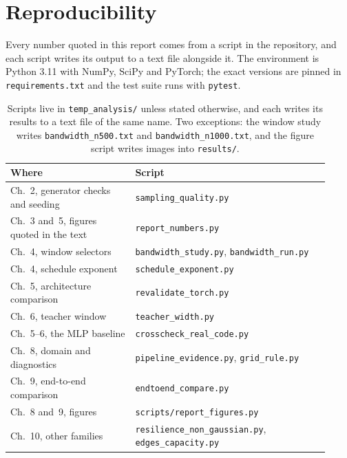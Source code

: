 \documentclass[11pt]{article}
\begin{document}
\section{Reproducibility}
\label{app:repro}

Every number quoted in this report comes from a script in the repository, and each script
writes its output to a text file alongside it. The environment is Python 3.11 with NumPy,
SciPy and PyTorch; the exact versions are pinned in \texttt{requirements.txt} and the test
suite runs with \texttt{pytest}.

\begin{table}[H]
\centering
\begin{tabular}{@{}>{\raggedright\arraybackslash}p{0.36\linewidth}%
                  >{\raggedright\arraybackslash}p{0.56\linewidth}@{}}
\toprule
\textbf{Where} & \textbf{Script} \\
\midrule
Ch.~2, generator checks and seeding & \texttt{sampling\_quality.py} \\
Ch.~3 and~5, figures quoted in the text & \texttt{report\_numbers.py} \\
Ch.~4, window selectors & \texttt{bandwidth\_study.py}, \texttt{bandwidth\_run.py} \\
Ch.~4, schedule exponent & \texttt{schedule\_exponent.py} \\
Ch.~5, architecture comparison & \texttt{revalidate\_torch.py} \\
Ch.~6, teacher window & \texttt{teacher\_width.py} \\
Ch.~5--6, the MLP baseline & \texttt{crosscheck\_real\_code.py} \\
Ch.~8, domain and diagnostics & \texttt{pipeline\_evidence.py}, \texttt{grid\_rule.py} \\
Ch.~9, end-to-end comparison & \texttt{endtoend\_compare.py} \\
Ch.~8 and~9, figures & \texttt{scripts/report\_figures.py} \\
Ch.~10, other families & \texttt{resilience\_non\_gaussian.py},
  \texttt{edges\_capacity.py} \\
\bottomrule
\end{tabular}
\caption{Scripts live in \texttt{temp\_analysis/} unless stated otherwise, and each writes
its results to a text file of the same name. Two exceptions: the window study writes
\texttt{bandwidth\_n500.txt} and \texttt{bandwidth\_n1000.txt}, and the figure script writes
images into \texttt{results/}.}
\label{tab:scripts}
\end{table}
\end{document}
